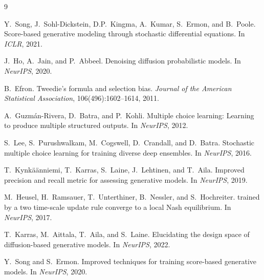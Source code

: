 \documentclass[11pt,a4paper]{article}
\begin{document}

\begin{thebibliography}{9}

Y.~Song, J.~Sohl-Dickstein, D.P.~Kingma, A.~Kumar, S.~Ermon, and
B.~Poole.
\newblock Score-based generative modeling through stochastic differential
  equations.
\newblock In \emph{ICLR}, 2021.

J.~Ho, A.~Jain, and P.~Abbeel.
\newblock Denoising diffusion probabilistic models.
\newblock In \emph{NeurIPS}, 2020.

B.~Efron.
\newblock Tweedie's formula and selection bias.
\newblock \emph{Journal of the American Statistical Association},
  106(496):1602--1614, 2011.

A.~Guzm\'an-Rivera, D.~Batra, and P.~Kohli.
\newblock Multiple choice learning: Learning to produce multiple structured
  outputs.
\newblock In \emph{NeurIPS}, 2012.

S.~Lee, S.~Purushwalkam, M.~Cogswell, D.~Crandall, and D.~Batra.
\newblock Stochastic multiple choice learning for training diverse deep
  ensembles.
\newblock In \emph{NeurIPS}, 2016.

T.~Kynk\"a\"anniemi, T.~Karras, S.~Laine, J.~Lehtinen, and T.~Aila.
\newblock Improved precision and recall metric for assessing generative
  models.
\newblock In \emph{NeurIPS}, 2019.

M.~Heusel, H.~Ramsauer, T.~Unterthiner, B.~Nessler, and S.~Hochreiter.
 trained by a two time-scale update rule converge to a
  local {Nash} equilibrium.
\newblock In \emph{NeurIPS}, 2017.

T.~Karras, M.~Aittala, T.~Aila, and S.~Laine.
\newblock Elucidating the design space of diffusion-based generative
  models.
\newblock In \emph{NeurIPS}, 2022.

Y.~Song and S.~Ermon.
\newblock Improved techniques for training score-based generative models.
\newblock In \emph{NeurIPS}, 2020.

\end{thebibliography}
\end{document}
